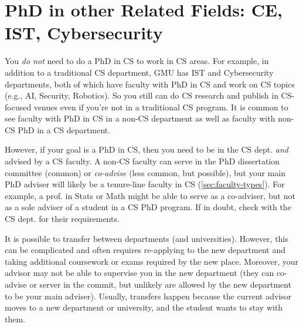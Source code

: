 \documentclass[oneside,11pt]{book}
\newenvironment{commentbox}[1][]{
  \small
  \begin{marker}[\faChessPawn{}]
    {\textbf{#1}}
  }{
  \end{marker}
}
\begin{document}



\section{PhD in other Related Fields: CE, IST, Cybersecurity}\label{sec:related-fields}

You \emph{do not} need to do a PhD in CS to work in CS areas. For example, in addition to a traditional CS department, GMU has IST and Cybersecurity departments, both of which have faculty with PhD in CS and work on CS topics (e.g., AI, Security, Robotics).  So you still can do CS research and publish in CS-focused venues even if you're not in a traditional CS program.  It is common to see faculty with PhD in CS in a non-CS department as well as faculty with non-CS PhD in a CS department.

However, if your goal is a PhD in CS, then you need to be in the CS dept. \emph{and} advised by a CS faculty. A non-CS faculty can serve in the PhD dissertation committee (common) or \emph{co-advise} (less common, but possible), but your main PhD adviser will likely be a tenure-line faculty in CS (\autoref{sec:faculty-types}).
For example, a prof. in Stats or Math might be able to serve as a co-adviser, but not as a sole adviser of a student in a CS PhD program.
If in doubt, check with the CS dept. for their requirements.

It is possible to transfer between departments (and universities). However, this can be complicated and often requires re-applying to the new department and taking additional coursework or exams required by the new place. Moreover, your advisor may not be able to supervise you in the new department (they can co-advise or server in the commit, but unlikely are allowed by the new department to be your main adviser).  Usually, transfers happen because the current advisor moves to a new department or university, and the student wants to stay with them.
\end{document}
